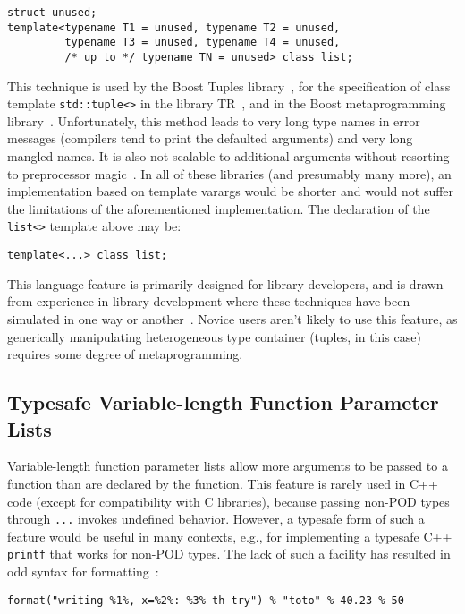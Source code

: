 \documentclass{article}
\begin{document}
\begin{verbatim}
struct unused;
template<typename T1 = unused, typename T2 = unused, 
         typename T3 = unused, typename T4 = unused, 
         /* up to */ typename TN = unused> class list;
\end{verbatim}

This technique is used by the Boost Tuples library~\cite{Tuples01},
for the specification of class template {\tt std::tuple<>} in the
library TR~\cite{Jarvi02}, and in the Boost metaprogramming
library~\cite{Gurtovoy02}. Unfortunately, this method leads to very
long type names in error messages (compilers tend to print the
defaulted arguments) and very long mangled names. It is also not
scalable to additional arguments without resorting to preprocessor
magic~\cite{Preprocessor01}. In all of these libraries (and presumably
many more), an implementation based on template varargs would be
shorter and would not suffer the limitations of the aforementioned
implementation. The declaration of the {\tt list<>} template above may
be:
\begin{verbatim}
template<...> class list;
\end{verbatim}

This language feature is primarily designed for library developers,
and is drawn from experience in library development where these
techniques have been simulated in one way or
another~\cite{Gurtovoy02,Lambda02,Tuples01,Function01,Bind01}. Novice
users aren't likely to use this feature, as generically manipulating
heterogeneous type container (tuples, in this case) requires some
degree of metaprogramming.

\subsection{Typesafe Variable-length Function Parameter Lists}
Variable-length function parameter lists allow more arguments to be
passed to a function than are declared by the function. This feature
is rarely used in C++ code (except for compatibility with C
libraries), because passing non-POD types through {\tt ...} invokes
undefined behavior. However, a typesafe form of such a feature would
be useful in many contexts, e.g., for implementing a typesafe C++
{\tt printf} that works for non-POD types. The lack of such a facility
has resulted in odd syntax for formatting~\cite{Krempp02}:
\begin{verbatim}
format("writing %1%, x=%2%: %3%-th try") % "toto" % 40.23 % 50
\end{verbatim}
\end{document}
